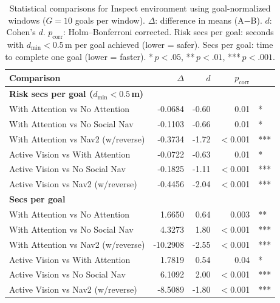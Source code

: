 \begin{table}[h]
\centering
\small
\begin{tabular}{lrrrl}
\toprule
\textbf{Comparison} & \textbf{$\Delta$} & \textbf{$d$} & \textbf{$p_{\mathrm{corr}}$} & \\
\midrule
\multicolumn{5}{l}{\textbf{Risk secs per goal ($d_{\min} < 0.5$\,m)}} \\
\quad With Attention vs No Attention & -0.0684 & -0.60 & 0.01 & * \\
\quad With Attention vs No Social Nav & -0.1103 & -0.66 & 0.01 & * \\
\quad With Attention vs Nav2 (w/reverse) & -0.3734 & -1.72 & $<$0.001 & *** \\
\quad Active Vision vs With Attention & -0.0722 & -0.63 & 0.01 & * \\
\quad Active Vision vs No Social Nav & -0.1825 & -1.11 & $<$0.001 & *** \\
\quad Active Vision vs Nav2 (w/reverse) & -0.4456 & -2.04 & $<$0.001 & *** \\
\midrule
\multicolumn{5}{l}{\textbf{Secs per goal}} \\
\quad With Attention vs No Attention & 1.6650 & 0.64 & 0.003 & ** \\
\quad With Attention vs No Social Nav & 4.3273 & 1.80 & $<$0.001 & *** \\
\quad With Attention vs Nav2 (w/reverse) & -10.2908 & -2.55 & $<$0.001 & *** \\
\quad Active Vision vs With Attention & 1.7819 & 0.54 & 0.04 & * \\
\quad Active Vision vs No Social Nav & 6.1092 & 2.00 & $<$0.001 & *** \\
\quad Active Vision vs Nav2 (w/reverse) & -8.5089 & -1.80 & $<$0.001 & *** \\
\bottomrule
\end{tabular}
\caption{Statistical comparisons for Inspect environment using goal-normalized windows ($G = 10$ goals per window). $\Delta$: difference in means (A$-$B). $d$: Cohen's $d$. $p_{\mathrm{corr}}$: Holm--Bonferroni corrected. Risk secs per goal: seconds with $d_{\min} < 0.5$\,m per goal achieved (lower = safer). Secs per goal: time to complete one goal (lower = faster). *\,$p < .05$, **\,$p < .01$, ***\,$p < .001$.}
\label{tab:stats_inspect}
\end{table}